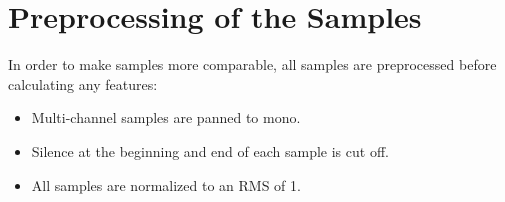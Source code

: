 ﻿\section{Preprocessing of the Samples}
\label{sec:Preprocessing}

In order to make samples more comparable, all samples are preprocessed before calculating any features:
\begin{itemize}
  \item Multi-channel samples are panned to mono.
  \item Silence at the beginning and end of each sample is cut off.
  \item All samples are normalized to an RMS of 1.
\end{itemize}